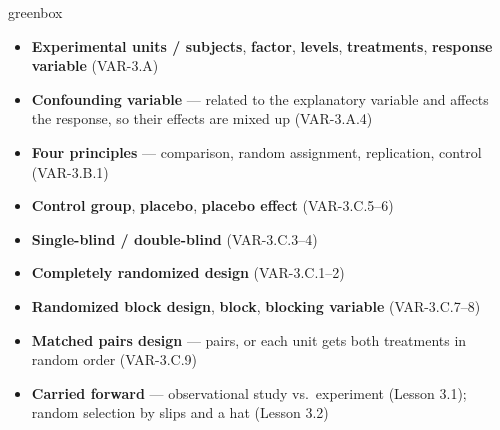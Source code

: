 \documentclass[10pt]{article}
\begin{document}
\boxguard
\begin{skillbox}{greenbox}
\begin{minipage}[t]{0.48\linewidth}
    \begin{itemize}
        \item \textbf{Experimental units / subjects}, \textbf{factor}, \textbf{levels},
              \textbf{treatments}, \textbf{response variable} (VAR-3.A)
        \item \textbf{Confounding variable} --- related to the explanatory variable and
              affects the response, so their effects are mixed up (VAR-3.A.4)
        \item \textbf{Four principles} --- comparison, random assignment, replication,
              control (VAR-3.B.1)
        \item \textbf{Control group}, \textbf{placebo}, \textbf{placebo effect}
              (VAR-3.C.5--6)
    \end{itemize}
\end{minipage}
\hfill
\begin{minipage}[t]{0.48\linewidth}
    \begin{itemize}
        \item \textbf{Single-blind / double-blind} (VAR-3.C.3--4)
        \item \textbf{Completely randomized design} (VAR-3.C.1--2)
        \item \textbf{Randomized block design}, \textbf{block}, \textbf{blocking variable}
              (VAR-3.C.7--8)
        \item \textbf{Matched pairs design} --- pairs, or each unit gets both treatments in
              random order (VAR-3.C.9)
        \item \textbf{Carried forward} --- observational study vs.\ experiment (Lesson 3.1);
              random selection by slips and a hat (Lesson 3.2)
    \end{itemize}
\end{minipage}
\end{skillbox}
\end{document}
